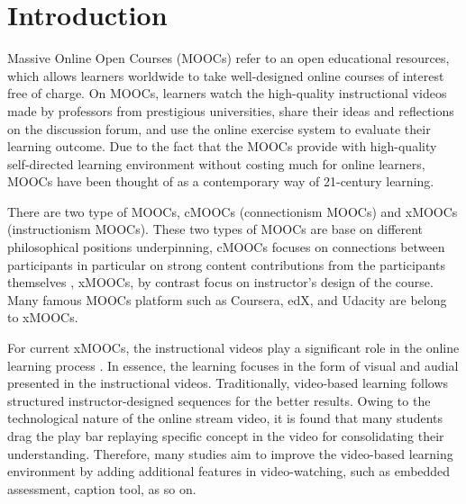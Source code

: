 \chapter{Introduction}
Massive Online Open Courses (MOOCs) refer to an open educational resources,
which allows learners worldwide to take well-designed online courses of interest free of charge.
On MOOCs, learners watch the high-quality instructional videos made by professors from prestigious universities,
share their ideas and reflections on the discussion forum,
and use the online exercise system to evaluate their learning outcome.
Due to the fact that the MOOCs provide with high-quality self-directed learning environment without costing much for online learners,
MOOCs have been thought of as a contemporary way of 21-century learning.

There are two type of MOOCs, cMOOCs (connectionism MOOCs) and xMOOCs (instructionism MOOCs).
These two types of MOOCs are base on different philosophical positions underpinning,
cMOOCs focuses on connections between participants in particular on strong content contributions from the participants themselves \cite{yeager2013cmoocs},
xMOOCs, by contrast focus on instructor's design of the course.
Many famous MOOCs platform such as Coursera\cite{coursera}, edX\cite{edx}, and Udacity\cite{udacity} are belong to xMOOCs.

For current xMOOCs, the instructional videos play a significant role in the online learning process \cite{breslow:2013,seaton2014}.
In essence, the learning focuses in the form of visual and audial presented in the instructional videos.
Traditionally, video-based learning follows structured instructor-designed sequences for the better results.
Owing to the technological nature of the online stream video, it is found that many students drag the play bar replaying specific concept in the video for consolidating their understanding.
Therefore, many studies aim to improve the video-based learning environment by adding additional features in video-watching, such as embedded assessment, caption tool, as so on.

